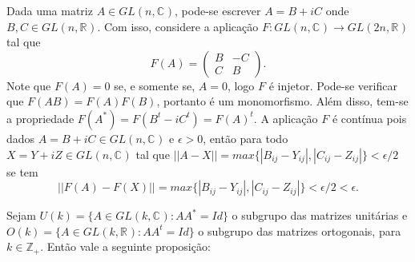 \documentclass[12pt]{book}
\newenvironment{prova}[1]{$\square$ #1}{\hfill$\blacksquare$}
\newcommand{\complexo}[1]{\mathbb{C}^{#1}}
\newcommand{\generalgroup}[2]{GL(#1, #2)}
\newcommand{\generalgroupreal}[1]{\generalgroup{#1}{\real{}}}
\newcommand{\generalgroupcomplexo}[1]{\generalgroup{#1}{\complexo{}}}
\newcommand{\inteiros}{\mathbb{Z}}
\newcommand{\matrizortogonal}[1]{O(#1)}
\newcommand{\matrizunitaria}[1]{U(#1)}
\newcommand{\real}[1]{\mathbb{R}^{#1}}
\begin{document}
	
	Dada uma matriz $A \in \generalgroupcomplexo{n}$, pode-se escrever $A = B+iC$ onde $B,C \in \generalgroupreal{n}$. Com isso, considere a aplicação $F:\generalgroupcomplexo{n} \to \generalgroupreal{2n}$ tal que 
	$$
	F(A)=
	\left(
	\begin{array}{cc}
	B & -C
	\\
	C & B
	\end{array}
	\right).
	$$
	Note que $F(A) = 0$ se, e somente se, $A=0$, logo $F$ é injetor. Pode-se verificar que $F(AB)=F(A)F(B)$, portanto é um monomorfismo. Além disso, tem-se a propriedade $F(A^{*}) = F(B^{t} - iC^{t}) = F(A)^{t}$. A aplicação $F$ é contínua pois dados $A=B+iC \in \generalgroupcomplexo{n}$ e $\epsilon > 0$, então para todo $X= Y+iZ \in \generalgroupcomplexo{n}$ tal que $||A - X||=max \{|B_{ij} - Y_{ij}|,  |C_{ij} - Z_{ij}|\} < \epsilon/2$ se tem 
	$$
	||F(A) - F(X)|| = max \{|B_{ij} - Y_{ij}|, |C_{ij} - Z_{ij}| \}< \epsilon/2 < \epsilon.
	$$
	
	Sejam $\matrizunitaria{k} = \{A\in \generalgroupcomplexo{k}: AA^{*}=Id \}$ o subgrupo das matrizes unitárias e $\matrizortogonal{k} = \{A \in \generalgroupreal{k}: AA^{t}  =Id \}$ o subgrupo das matrizes ortogonais, para $k\in \inteiros_{+}$. Então vale a seguinte proposição:
	
\end{document}
